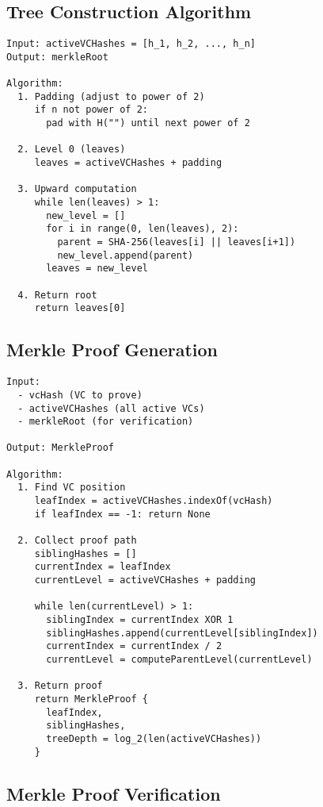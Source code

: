 \subsection{Tree Construction Algorithm}

\begin{verbatim}
Input: activeVCHashes = [h_1, h_2, ..., h_n]
Output: merkleRoot

Algorithm:
  1. Padding (adjust to power of 2)
     if n not power of 2:
       pad with H("") until next power of 2

  2. Level 0 (leaves)
     leaves = activeVCHashes + padding

  3. Upward computation
     while len(leaves) > 1:
       new_level = []
       for i in range(0, len(leaves), 2):
         parent = SHA-256(leaves[i] || leaves[i+1])
         new_level.append(parent)
       leaves = new_level

  4. Return root
     return leaves[0]
\end{verbatim}

\subsection{Merkle Proof Generation}

\begin{verbatim}
Input:
  - vcHash (VC to prove)
  - activeVCHashes (all active VCs)
  - merkleRoot (for verification)

Output: MerkleProof

Algorithm:
  1. Find VC position
     leafIndex = activeVCHashes.indexOf(vcHash)
     if leafIndex == -1: return None

  2. Collect proof path
     siblingHashes = []
     currentIndex = leafIndex
     currentLevel = activeVCHashes + padding

     while len(currentLevel) > 1:
       siblingIndex = currentIndex XOR 1
       siblingHashes.append(currentLevel[siblingIndex])
       currentIndex = currentIndex / 2
       currentLevel = computeParentLevel(currentLevel)

  3. Return proof
     return MerkleProof {
       leafIndex,
       siblingHashes,
       treeDepth = log_2(len(activeVCHashes))
     }
\end{verbatim}

\subsection{Merkle Proof Verification}

